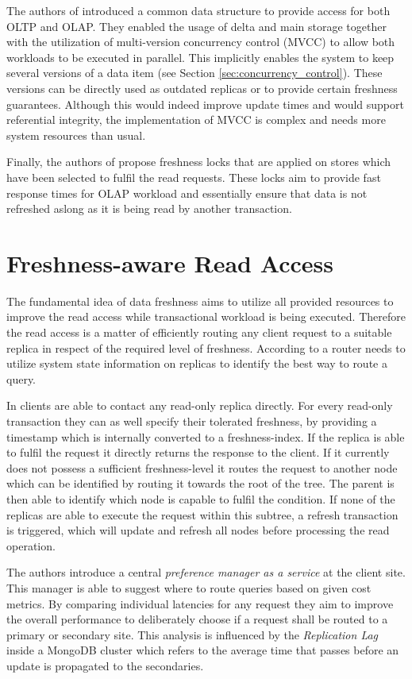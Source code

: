 The authors of \cite{psaroudakis:2015} introduced a common data structure to provide access for both OLTP and OLAP. 
They enabled the usage of delta and main storage together with the utilization of multi-version concurrency control (MVCC) to allow both workloads to be executed in parallel.
This implicitly enables the system to keep several versions of a data item (see Section \ref{sec:concurrency_control}).
These versions can be directly used as outdated replicas or to provide certain freshness guarantees.
Although this would indeed improve update times and would support referential integrity, the implementation of MVCC is complex and needs more system resources than usual.

Finally, the authors of \cite{akal:2005} propose freshness locks that are applied on stores which have been selected to fulfil the read requests. 
These locks aim to provide fast response times for OLAP workload and essentially ensure that data is not refreshed aslong as it is being read by another transaction.



\section{Freshness-aware Read Access}
\label{r:read}
The fundamental idea of data freshness aims to utilize all provided resources to improve the read access while transactional workload is being executed.
Therefore the read access is a matter of efficiently routing any client request to a suitable replica in respect of the required level of freshness.
According to \cite{rohm:2002, akal:2005} a router needs to utilize system state information on replicas to identify the best way to route a query.

In \cite{voicu:2010} clients are able to contact any read-only replica directly. For every read-only transaction they can as well specify
their tolerated freshness, by providing a timestamp which is internally converted to a freshness-index. If the replica is able to fulfil the request 
it directly returns the response to the client. If it currently does not possess a sufficient freshness-level it routes the request to another node which can be identified 
by routing it towards the root of the tree. The parent is then able to identify which node is capable to fulfil the condition.  
If none of the replicas are able to execute the request within this subtree, a refresh transaction is triggered, which will update and refresh all nodes before 
processing the read operation.

The authors \cite{huang:2020} introduce a central \emph{preference manager as a service} at the client site. This manager is able to suggest where to route queries 
based on given cost metrics. By comparing individual latencies for any request they aim to improve the overall performance to deliberately choose if a request 
shall be routed to a primary or secondary site. This analysis is influenced by the \emph{Replication Lag} inside a MongoDB cluster which refers to the average time 
that passes before an update is propagated to the secondaries. 




